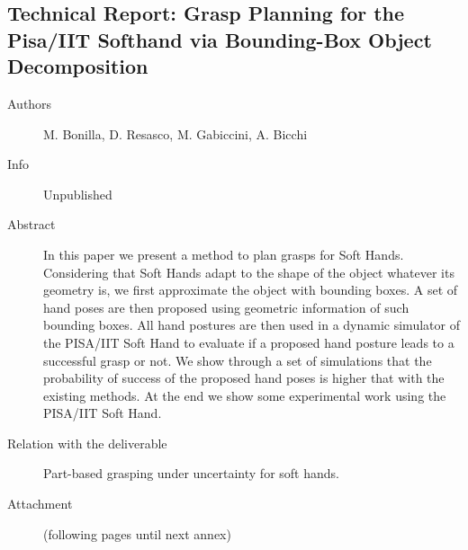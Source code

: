 \documentclass[a4paper,11pt,pdf]{pacmanreport}
\begin{document}
\subsection{Technical Report: Grasp Planning for the Pisa/IIT Softhand via Bounding-Box Object Decomposition} \label{ann:boxedGrasp}
\begin{description}
    \item[Authors] M. Bonilla, D. Resasco, M. Gabiccini, A. Bicchi
    \item[Info] Unpublished
    \item[Abstract] In this paper we present a method to plan grasps for Soft Hands. Considering that Soft Hands adapt to the shape of the object whatever its geometry is, we first approximate the object with bounding boxes. A set of hand poses are then proposed using geometric information of such bounding boxes. All hand postures are then used in a dynamic simulator of the PISA/IIT Soft Hand to evaluate if a proposed hand posture leads to a successful grasp or not.
    We show through a set of simulations that the probability of success of the proposed hand poses is higher that with the existing methods.
    At the end we show some experimental work using the PISA/IIT Soft Hand.
    \item[Relation with the deliverable] Part-based grasping under uncertainty for soft hands.
    \item[Attachment] (following pages until next annex)
\end{description}
%
\end{document}

